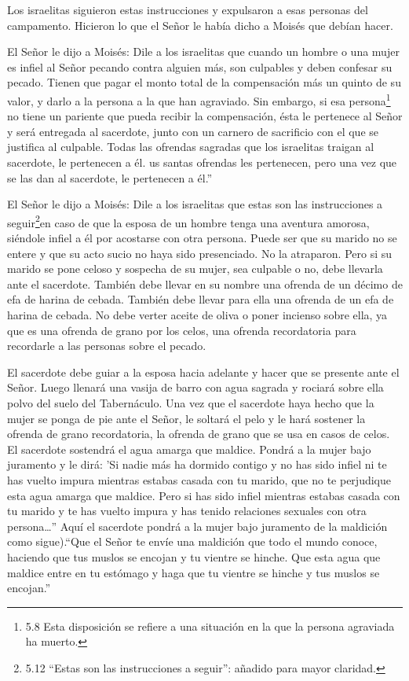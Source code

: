  Los israelitas siguieron estas instrucciones y expulsaron a
esas personas del campamento. Hicieron lo que el Señor le había dicho a
Moisés que debían hacer.

 El Señor le dijo a Moisés:  Dile a los
israelitas que cuando un hombre o una mujer es infiel al Señor pecando
contra alguien más, son culpables  y deben confesar su
pecado. Tienen que pagar el monto total de la compensación más un quinto
de su valor, y darlo a la persona a la que han agraviado. 
Sin embargo, si esa persona\footnote{5.8 Esta disposición se refiere a
  una situación en la que la persona agraviada ha muerto.} no tiene un
pariente que pueda recibir la compensación, ésta le pertenece al Señor y
será entregada al sacerdote, junto con un carnero de sacrificio con el
que se justifica al culpable.  Todas las ofrendas sagradas
que los israelitas traigan al sacerdote, le pertenecen a él.
 us santas ofrendas les pertenecen, pero una vez que se las
dan al sacerdote, le pertenecen a él.''

 El Señor le dijo a Moisés:  Dile a los
israelitas que estas son las instrucciones a seguir\footnote{5.12
  ``Estas son las instrucciones a seguir'': añadido para mayor claridad.}en
caso de que la esposa de un hombre tenga una aventura amorosa, siéndole
infiel a él  por acostarse con otra persona. Puede ser que
su marido no se entere y que su acto sucio no haya sido presenciado. No
la atraparon.  Pero si su marido se pone celoso y sospecha
de su mujer, sea culpable o no,  debe llevarla ante el
sacerdote. También debe llevar en su nombre una ofrenda de un décimo de
efa de harina de cebada. También debe llevar para ella una ofrenda de un
efa de harina de cebada. No debe verter aceite de oliva o poner incienso
sobre ella, ya que es una ofrenda de grano por los celos, una ofrenda
recordatoria para recordarle a las personas sobre el pecado.

 El sacerdote debe guiar a la esposa hacia adelante y hacer
que se presente ante el Señor.  Luego llenará una vasija de
barro con agua sagrada y rociará sobre ella polvo del suelo del
Tabernáculo.  Una vez que el sacerdote haya hecho que la
mujer se ponga de pie ante el Señor, le soltará el pelo y le hará
sostener la ofrenda de grano recordatoria, la ofrenda de grano que se
usa en casos de celos. El sacerdote sostendrá el agua amarga que
maldice.  Pondrá a la mujer bajo juramento y le dirá: 'Si
nadie más ha dormido contigo y no has sido infiel ni te has vuelto
impura mientras estabas casada con tu marido, que no te perjudique esta
agua amarga que maldice.  Pero si has sido infiel mientras
estabas casada con tu marido y te has vuelto impura y has tenido
relaciones sexuales con otra persona\ldots''  Aquí el
sacerdote pondrá a la mujer bajo juramento de la maldición como
sigue).``Que el Señor te envíe una maldición que todo el mundo conoce,
haciendo que tus muslos se encojan y tu vientre se hinche. 
Que esta agua que maldice entre en tu estómago y haga que tu vientre se
hinche y tus muslos se encojan.''

